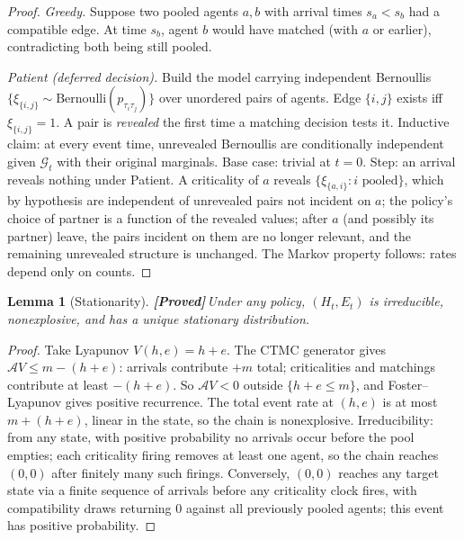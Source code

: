 \documentclass{article}
\theoremstyle{plain}
\newtheorem{lemma}{Lemma}
\theoremstyle{definition}
\newcommand{\proved}{\textcolor{provedgreen}{\textbf{[Proved]}}\,}
\begin{document}
\begin{proof}
\emph{Greedy.} Suppose two pooled agents $a,b$ with arrival times $s_a<s_b$ had a compatible edge. At time $s_b$, agent $b$ would have matched (with $a$ or earlier), contradicting both being still pooled.

\emph{Patient (deferred decision).} Build the model carrying independent Bernoullis $\{\xi_{\{i,j\}}\sim\mathrm{Bernoulli}(p_{\tau_i\tau_j})\}$ over unordered pairs of agents. Edge $\{i,j\}$ exists iff $\xi_{\{i,j\}}=1$. A pair is \emph{revealed} the first time a matching decision tests it. Inductive claim: at every event time, unrevealed Bernoullis are conditionally independent given $\mathcal{G}_t$ with their original marginals. Base case: trivial at $t=0$. Step: an arrival reveals nothing under Patient. A criticality of $a$ reveals $\{\xi_{\{a,i\}}:i\text{ pooled}\}$, which by hypothesis are independent of unrevealed pairs not incident on $a$; the policy's choice of partner is a function of the revealed values; after $a$ (and possibly its partner) leave, the pairs incident on them are no longer relevant, and the remaining unrevealed structure is unchanged. The Markov property follows: rates depend only on counts.
\end{proof}

\begin{lemma}[Stationarity]\label{lem:stationary}
\proved Under any policy, $(H_t,E_t)$ is irreducible, nonexplosive, and has a unique stationary distribution.
\end{lemma}

\begin{proof}
Take Lyapunov $V(h,e)=h+e$. The CTMC generator gives $\mathcal A V\le m-(h+e)$: arrivals contribute $+m$ total; criticalities and matchings contribute at least $-(h+e)$. So $\mathcal A V<0$ outside $\{h+e\le m\}$, and Foster--Lyapunov \cite[Theorem~5.5]{meyn1993stability} gives positive recurrence. The total event rate at $(h,e)$ is at most $m+(h+e)$, linear in the state, so the chain is nonexplosive. Irreducibility: from any state, with positive probability no arrivals occur before the pool empties; each criticality firing removes at least one agent, so the chain reaches $(0,0)$ after finitely many such firings. Conversely, $(0,0)$ reaches any target state via a finite sequence of arrivals before any criticality clock fires, with compatibility draws returning $0$ against all previously pooled agents; this event has positive probability.
\end{proof}
\end{document}
